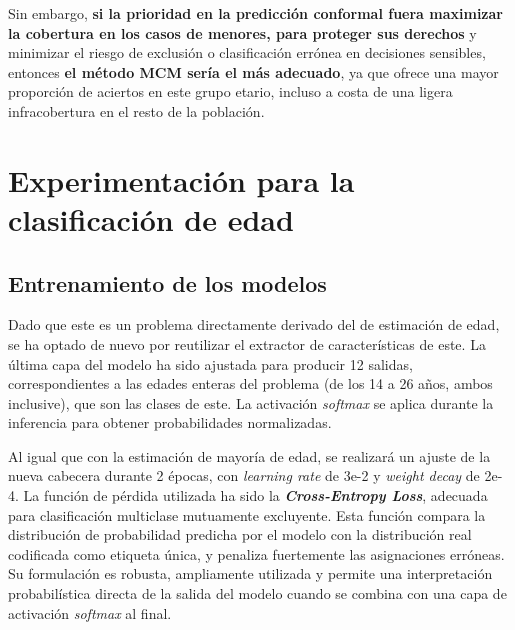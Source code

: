 Sin embargo, \textbf{si la prioridad en la predicción conformal fuera maximizar la cobertura en los casos de menores, para proteger sus derechos} y minimizar el riesgo de exclusión o clasificación errónea en decisiones sensibles, entonces \textbf{el método MCM sería el más adecuado}, ya que ofrece una mayor proporción de aciertos en este grupo etario, incluso a costa de una ligera infracobertura en el resto de la población.


\FloatBarrier



\section{Experimentación para la clasificación de edad}


\subsection{Entrenamiento de los modelos}

Dado que este es un problema directamente derivado del de estimación de edad, se ha optado de nuevo por reutilizar el extractor de características de este. La última capa del modelo ha sido ajustada para producir 12 salidas, correspondientes a las edades enteras del problema (de los 14 a 26 años, ambos inclusive), que son las clases de este. La activación \textit{softmax} se aplica durante la inferencia para obtener probabilidades normalizadas.

Al igual que con la estimación de mayoría de edad, se realizará un ajuste de la nueva cabecera durante 2 épocas, con \textit{learning rate} de 3e-2 y \textit{weight decay} de 2e-4. La función de pérdida utilizada ha sido la \textbf{\textit{Cross-Entropy Loss}}, adecuada para clasificación multiclase mutuamente excluyente. Esta función compara la distribución de probabilidad predicha por el modelo con la distribución real codificada como etiqueta única, y penaliza fuertemente las asignaciones erróneas. Su formulación es robusta, ampliamente utilizada y permite una interpretación probabilística directa de la salida del modelo cuando se combina con una capa de activación \textit{softmax} al final.

